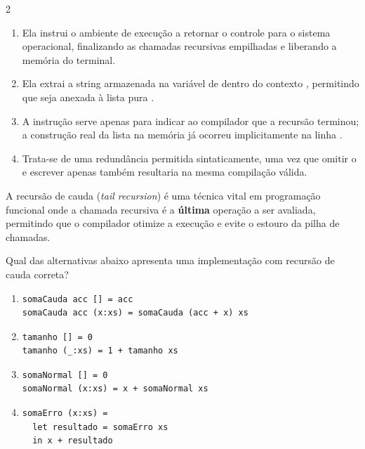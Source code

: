 \documentclass[a4paper,10pt,brazil]{article}
\begin{document}
\begin{multicols}{2}
\begin{enumerate}
  \item Ela instrui o ambiente de execução a retornar o controle para o sistema operacional, finalizando as chamadas recursivas empilhadas e liberando a memória do terminal.

  \item Ela extrai a string armazenada na variável  de dentro do contexto , permitindo que seja anexada à lista pura .

  \item A instrução  serve apenas para indicar ao compilador que a recursão terminou; a construção real da lista na memória já ocorreu implicitamente na linha .

  \item Trata-se de uma redundância permitida sintaticamente, uma vez que omitir o  e escrever apenas  também resultaria na mesma compilação válida.


\end{enumerate}

A recursão de cauda (\emph{tail recursion}) é uma técnica vital em programação funcional onde a chamada recursiva é a \textbf{última} operação a ser avaliada, permitindo que o compilador otimize a execução e evite o estouro da pilha de chamadas. 

Qual das alternativas abaixo apresenta uma implementação com recursão de cauda correta?

\begin{enumerate}
  \item \begin{verbatim}
somaCauda acc [] = acc
somaCauda acc (x:xs) = somaCauda (acc + x) xs
\end{verbatim}

  \item \begin{verbatim}
tamanho [] = 0
tamanho (_:xs) = 1 + tamanho xs
\end{verbatim}

  \item \begin{verbatim}
somaNormal [] = 0
somaNormal (x:xs) = x + somaNormal xs
\end{verbatim}

  \item \begin{verbatim}
somaErro (x:xs) = 
  let resultado = somaErro xs 
  in x + resultado
\end{verbatim}


\end{enumerate}
\end{multicols}
\end{document}
